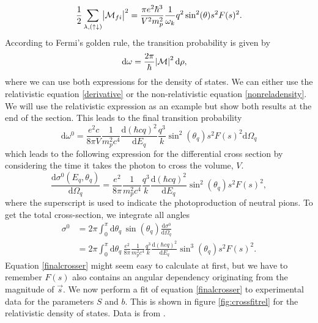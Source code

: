 \begin{equation} \label{absmatrixexact}
	\frac{1}{2}\sum_{\lambda,(\uparrow\downarrow)} \abs{\mathcal{M}_{fi}}^2 = \frac{\pi e^2\hbar^3}{V^2 m_p^2}\frac{1}{\omega_k} q^2\sin^2(\theta) s^2 F(s)^2.
\end{equation}
According to Fermi's golden rule, the transition probability is given by
\begin{align}\label{Fermisgolden}
	\text{d}\omega &= \frac{2\pi}{\hbar}\abs{\mathcal{M}}^2\text{d}\rho,
\end{align}
where we can use both expressions for the density of states. We can either use the relativistic equation \eqref{derivative} or the non-relativistic equation \eqref{nonreladensity}. We will use the relativistic expression as an example but show both results at the end of the section. This leads to the final transition probability
\begin{equation}
	\text{d}\omega^0 = \frac{e^2c}{8\pi V}\frac{1}{m_p^2 c^4}\frac{\text{d}(\hbar c q)^2}{\text{d}E_q}\frac{q^3}{k} \sin^2(\theta_q) s^2 F(s)^2 \text{d}\Omega_q
\end{equation}
which leads to the following expression for the differential cross section by considering the time it takes the photon to cross the volume, $V$.
\begin{equation}\label{exactdiffcross}
	\frac{\text{d}\sigma^0(E_q,\theta_q)}{\text{d}\Omega_q} = \frac{e^2}{8\pi}\frac{1}{m_p^2c^4}\frac{q^3}{k}\frac{\text{d}(\hbar c q)^2}{\text{d}E_q}\sin^2(\theta_q) s^2 F(s)^2,
\end{equation}
where the superscript is used to indicate the photoproduction of neutral pions. To get the total cross-section, we integrate all angles
\begin{align} \label{exactcross}
	\sigma^0 & = 2\pi \int_0^\pi \text{d}\theta_q \, \sin(\theta_q) \frac{\text{d}\sigma^0}{\text{d}\Omega_q} \\ &= 2\pi \int_0^\pi \text{d}\theta_q \, \frac{e^2}{8\pi}\frac{1}{m_p^2c^4}\frac{q^3}{k}\frac{\text{d}(\hbar c q)^2}{\text{d}E_q}\sin^3(\theta_q) s^2 F(s)^2 \label{finalcrosser}.
\end{align}
Equation \eqref{finalcrosser} might seem easy to calculate at first, but we have to remember $F(s)$ also contains an angular dependency originating from the magnitude of $\vec{s}$. We now perform a fit of equation \eqref{finalcrosser} to experimental data for the parameters $S$ and $b$. This is shown in figure \ref{fig:crossfitrel} for the relativistic density of states. Data is from  \cite{Schmidt_2001}.

